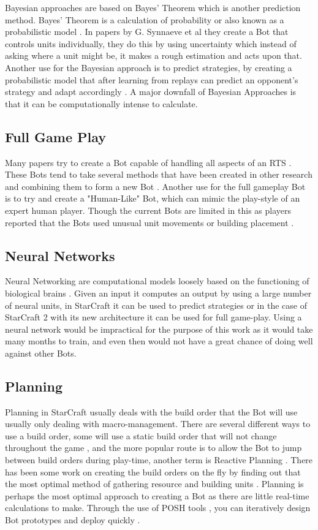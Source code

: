 \documentclass[journal]{IEEEtran}
\begin{document}
	Bayesian approaches are based on Bayes' Theorem which is another prediction method. Bayes' Theorem is a calculation of probability or also known as a probabilistic model \cite{BayesianAI}. In papers by G. Synnaeve et al \cite{UnitsControl,SpecialTactics} they create a Bot that controls units individually, they do this by using uncertainty which instead of asking where a unit might be, it makes a rough estimation and acts upon that. Another use for the Bayesian approach is to predict strategies, by creating a probabilistic model that after learning from replays can predict an opponent's strategy and adapt accordingly \cite{Bayesian}. A major downfall of Bayesian Approaches is that it can be computationally intense to calculate.
	
	\subsection{Full Game Play}
	Many papers try to create a Bot capable of handling all aspects of an RTS \cite{Agents,Hierarchical,HumanLevel,SCAIL}. These Bots tend to take several methods that have been created in other research and combining them to form a new Bot \cite{Agents}. Another use for the full gameplay Bot is to try and create a "Human-Like" Bot, which can mimic the play-style of an expert human player. Though the current Bots are limited in this as players reported that the Bots used unusual unit movements or building placement \cite{EvalHuman}.
	
	\subsection{Neural Networks}
	Neural Networking are computational models loosely based on the functioning of biological brains \cite{Deep}. Given an input it computes an output by using a large number of neural units, in StarCraft it can be used to predict strategies or in the case of StarCraft 2 with its new architecture it can be used for full game-play. Using a neural network would be impractical for the purpose of this work as it would take many months to train, and even then would not have a great chance of doing well against other Bots.
	
	\subsection{Planning}
	Planning in StarCraft usually deals with the build order that the Bot will use usually only dealing with macro-management. There are several different ways to use a build order, some will use a static build order that will not change throughout the game \cite{Swen}, and the more popular route is to allow the Bot to jump between build orders during play-time, another term is Reactive Planning \cite{Fuzzy,OnlineEvo,GoalDriven}. There has been some work on creating the build orders on the fly by finding out that the most optimal method of gathering resource and building units \cite{BuildOrder}. Planning is perhaps the most optimal approach to creating a Bot as there are little real-time calculations to make. Through the use of POSH tools \cite{POSH}, you can iteratively design Bot prototypes and deploy quickly \cite{Swen}. 
	
\end{document}
